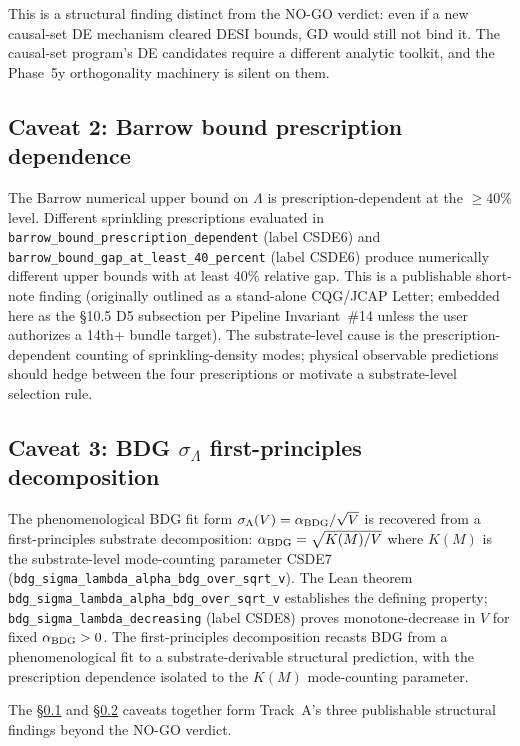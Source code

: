 \documentclass[aps,prd,reprint,nofootinbib,superscriptaddress]{revtex4-2}
\begin{document}
This is a structural finding distinct from the NO-GO verdict: even if a
new causal-set DE mechanism cleared DESI bounds, GD would still not bind
it. The causal-set program's DE candidates require a different analytic
toolkit, and the Phase~5y orthogonality machinery is silent on them.

\subsection{Caveat 2: Barrow bound prescription dependence}
\label{subsec:phase6m-track-a-caveat-barrow}

The Barrow numerical upper bound on $\Lambda$ is prescription-dependent at
the $\geq 40\%$ level. Different sprinkling prescriptions evaluated in
\texttt{barrow\_bound\_prescription\_dependent} (label CSDE6) and
\texttt{barrow\_bound\_gap\_at\_least\_40\_percent} (label CSDE6\textquotesingle)
produce numerically different upper bounds with at least $40\%$ relative
gap. This is a publishable short-note finding (originally outlined as
a stand-alone CQG/JCAP Letter; embedded here as the §10.5 D5 subsection
per Pipeline Invariant~\#14 unless the user authorizes a 14th+ bundle
target). The substrate-level cause is the prescription-dependent
counting of sprinkling-density modes; physical observable predictions
should hedge between the four prescriptions or motivate a substrate-level
selection rule.

\subsection{Caveat 3: BDG $\sigma_\Lambda$ first-principles decomposition}
\label{subsec:phase6m-track-a-caveat-bdg}

The phenomenological BDG fit form
$\sigma_\Lambda(V) = \alpha_{\rm BDG}/\sqrt{V}$ is recovered from a
first-principles substrate decomposition: $\alpha_{\rm BDG} = \sqrt{K(M)/V}$
where $K(M)$ is the substrate-level mode-counting parameter
CSDE7 (\texttt{bdg\_sigma\_lambda\_alpha\_bdg\_over\_sqrt\_v}). The Lean theorem
\texttt{bdg\_sigma\_lambda\_alpha\_bdg\_over\_sqrt\_v} establishes the
defining property; \texttt{bdg\_sigma\_lambda\_decreasing} (label CSDE8)
proves monotone-decrease in $V$ for fixed $\alpha_{\rm BDG} > 0$. The
first-principles decomposition recasts BDG from a phenomenological fit
to a substrate-derivable structural prediction, with the prescription
dependence isolated to the $K(M)$ mode-counting parameter.

The §\ref{subsec:phase6m-track-a-caveat-barrow} and §\ref{subsec:phase6m-track-a-caveat-bdg}
caveats together form Track~A's three publishable structural findings
beyond the NO-GO verdict.
\end{document}

